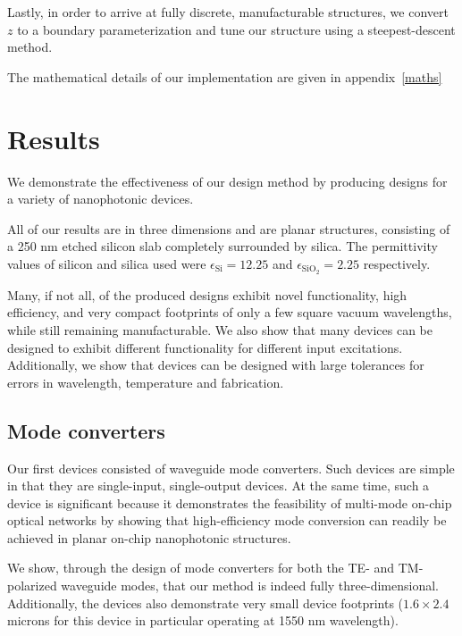 Lastly, in order to arrive at fully discrete, manufacturable structures,
    we convert $z$ to a boundary parameterization\cite{levelset}
    and tune our structure using a steepest-descent method.

The mathematical details of our implementation are given 
    in appendix~\ref{maths}

\section{Results}
We demonstrate the effectiveness of our design method 
    by producing designs for a variety of nanophotonic devices.

All of our results are in three dimensions
    and are planar structures, consisting of a 250 nm etched silicon slab
    completely surrounded by silica.
The permittivity values of silicon and silica used
    were $\epsilon_\text{Si} = 12.25$ and $\epsilon_\text{SiO$_2$} = 2.25$
    respectively.

Many, if not all, of the produced designs exhibit 
    novel functionality, high efficiency, and 
    very compact footprints of only a few square vacuum wavelengths,
    while still remaining manufacturable.
We also show that many devices can be designed
    to exhibit different functionality for different input excitations.
Additionally, we show that devices can be designed with large tolerances for
    errors in wavelength, temperature and fabrication.

\subsection{Mode converters}

Our first devices consisted of waveguide mode converters.
Such devices are simple in that they are single-input, single-output devices.
At the same time, such a device is significant because 
    it demonstrates the feasibility of multi-mode on-chip optical networks
    by showing that high-efficiency mode conversion 
    can readily be achieved in planar on-chip nanophotonic structures.

We show, through the design of mode converters for both the TE- and TM-polarized
    waveguide modes, 
    that our method is indeed fully three-dimensional.
Additionally, the devices also demonstrate very small device footprints 
    ($1.6 \times 2.4$ microns for this device in particular
    operating at 1550 nm wavelength).

